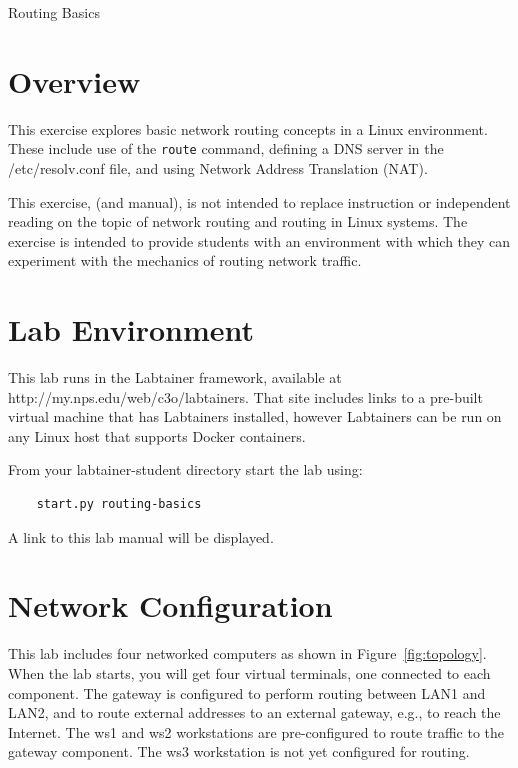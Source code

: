 


\begin{center}
{\LARGE Routing Basics}
\vspace{0.1in}\\
\end{center}

\copyrightnotice

\section{Overview}
This exercise explores basic network routing concepts 
in a Linux environment.  These include use of the \texttt{route}
command, defining a DNS server in the /etc/resolv.conf file,
and using Network Address Translation (NAT). 

This exercise, (and manual), is not intended to replace instruction
or independent reading on the topic of network routing and
routing in Linux systems. The exercise is intended to provide
students with an environment with which they can experiment
with the mechanics of routing network traffic.


\section{Lab Environment}
This lab runs in the Labtainer framework,
available at http://my.nps.edu/web/c3o/labtainers.
That site includes links to a pre-built virtual machine
that has Labtainers installed, however Labtainers can
be run on any Linux host that supports Docker containers.

From your labtainer-student directory start the lab using:
\begin{verbatim}
    start.py routing-basics
\end{verbatim}
\noindent A link to this lab manual will be displayed.  

\section{Network Configuration}
This lab includes four networked computers as shown in Figure~\ref{fig:topology}.
When the lab starts, you will get four virtual terminals, one connected to each
component.
The gateway is configured to perform routing between LAN1 and LAN2, and to
route external addresses to an external gateway, e.g., to reach the Internet.
The ws1 and ws2 workstations are pre-configured to route traffic to the gateway
component.  The ws3 workstation is not yet configured for routing.

